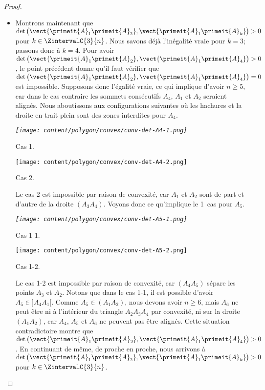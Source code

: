 \begin{proof}
\begin{itemize}
		\item
		Montrons maintenant que
		$\det \big( \vect{\primeit{A}_1 \primeit{A}_2}, \vect{\primeit{A}_1 \primeit{A}_k} \big) > 0$
		pour $k \in \ZintervalC{3}{n}$.
		Nous savons déjà l'inégalité vraie pour $k = 3$; passons donc à $k = 4$.
		Pour avoir 
		$\det \big( \vect{\primeit{A}_1 \primeit{A}_2}, \vect{\primeit{A}_1 \primeit{A}_4} \big) > 0$, 
		le point précédent donne qu'il faut vérifier que 
		$\det \big( \vect{\primeit{A}_1 \primeit{A}_2}, \vect{\primeit{A}_1 \primeit{A}_4} \big) = 0$
		est impossible.
		Supposons donc l'égalité vraie, ce qui implique d'avoir $n \geq 5$, car dans le cas contraire les sommets consécutifs $A_4$, $A_1$ et $A_2$ seraient alignés.
		Nous aboutissons aux configurations suivantes où les hachures et la droite en trait plein sont des zones interdites pour $A_4$.

        \begin{multicols}{2}
            \small\itshape\centering
           	\texttt{[image: content/polygon/convex/conv-det-A4-1.png]}
        	    
        	\smallskip
            Cas 1.
            
            \texttt{[image: content/polygon/convex/conv-det-A4-2.png]}
        	    
        	\smallskip
            Cas 2.
        \end{multicols}
    
		\noindent
		Le cas 2 est impossible par raison de convexité, car $A_1$ et $A_2$ sont de part et d'autre de la droite $(A_3 A_4)$. Voyons donc ce qu'implique le 1\ier\ cas pour $A_5$.
		
        \begin{multicols}{2}
            \small\itshape\centering
           	\texttt{[image: content/polygon/convex/conv-det-A5-1.png]}
        	    
        	\smallskip
            Cas 1-1.
            
            \texttt{[image: content/polygon/convex/conv-det-A5-2.png]}
        	    
        	\smallskip
            Cas 1-2.
        \end{multicols}
    
		\noindent
		Le cas 1-2 est impossible par raison de convexité, car $(A_4 A_5)$ sépare les points $A_3$ et $A_2$.
		Notons que dans le cas 1-1, il est possible d'avoir $A_5 \in {]A_4 A_1[}$.
		Comme $A_5 \in (A_1 A_2)$, nous devons avoir $n \geq 6$, 
		mais $A_6$ ne peut être ni à l'intérieur du triangle $A_2 A_3 A_4$ par convexité,
		ni sur la droite $(A_1 A_2)$, car $A_4$, $A_5$ et $A_6$ ne peuvent pas être alignés.
		Cette situation contradictoire montre que
		$\det \big( \vect{\primeit{A}_1 \primeit{A}_2}, \vect{\primeit{A}_1 \primeit{A}_4} \big) > 0$.
		En continuant de même, de proche en proche, nous arrivons à
		$\det \big( \vect{\primeit{A}_1 \primeit{A}_2}, \vect{\primeit{A}_1 \primeit{A}_k} \big) > 0$
		pour $k \in \ZintervalC{3}{n}$.



\end{itemize}
\end{proof}
